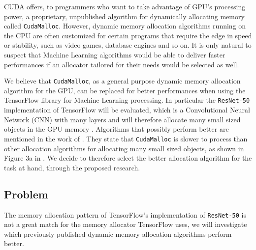 \documentclass[12pt,twoside]{article}
\begin{document}

CUDA offers, to programmers who want to take advantage of GPU's processing power, a proprietary, unpublished algorithm for dynamically allocating memory called \texttt{CudaMalloc}. However, dynamic memory allocation algorithms running on the CPU are often customized for certain programs that require the edge in speed or stability, such as video games, database engines and so on. It is only natural to suspect that Machine Learning algorithms would be able to deliver faster performances if an allocator tailored for their needs would be selected as well.

We believe that \texttt{CudaMalloc}, as a general purpose dynamic memory allocation algorithm for the GPU, can be replaced for better performances when using the TensorFlow \cite{abadi2016} library for Machine Learning processing. In particular the \texttt{ResNet-50} implementation of TensorFlow will be evaluated, which is a Convolutional Neural Network (CNN) with many layers and will therefore allocate many small sized objects in the GPU memory \cite{DBLP:HeZRS15}.
Algorithms that possibly perform better are mentioned in the work of \citeauthor{Vinkler2015} \cite{Vinkler2015}. They state that \texttt{CudaMalloc} is slower to process than other allocation algorithms for allocating many small sized objects, as shown in Figure 3a in \cite{Vinkler2015}. We decide to therefore select the better allocation algorithm for the task at hand, through the proposed research.

\subsection{Problem}
\label{sec:problem}



The memory allocation pattern of TensorFlow's implementation of \texttt{ResNet-50} is not a great match for the memory allocator TensorFlow uses, we will investigate which previously published dynamic memory allocation algorithms perform better.
\end{document}
